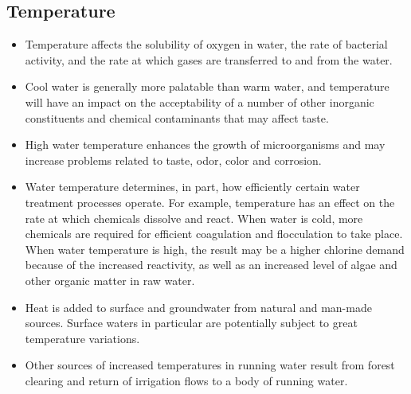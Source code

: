 \subsection{Temperature}
\begin{itemize}
\item Temperature affects the solubility of oxygen in water, the rate of bacterial activity, and the rate at which gases are transferred to and from the water.
\item Cool water is generally more palatable than warm water, and temperature will have an impact on the acceptability of a number of other inorganic constituents and chemical contaminants that may affect taste. 
\item High water temperature enhances the growth of microorganisms and may increase problems related to taste, odor, color and corrosion.
\item Water temperature determines, in part, how efficiently certain water treatment processes operate. For example, temperature has an effect on the rate at which chemicals dissolve and react. When water is cold, more chemicals are required for efficient coagulation and flocculation to take place. When water temperature is high, the result may be a higher chlorine demand because of the increased reactivity, as well as an increased level of algae and other organic matter in raw water.
\item Heat is added to surface and groundwater from natural and man-made sources.  Surface waters in particular  are potentially subject to great temperature variations. 
\item Other sources of increased temperatures in running water result from forest clearing and return of irrigation flows to a body of running water.
\end{itemize}

